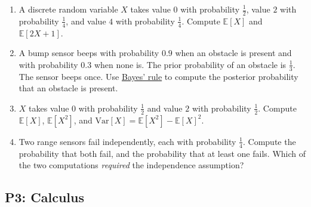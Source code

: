 \documentclass[11pt]{article}
\newcommand{\E}{\mathbb{E}}             %
\newcommand{\Var}{\mathrm{Var}}        %
\newenvironment{studentanswer}[1]
  {\par\noindent\begin{minipage}[t][#1][t]{\linewidth}\ignorespaces}
  {\end{minipage}\par}
\begin{document}
\begin{enumerate}[label=\alph*)]
\item A discrete random variable $X$ takes value $0$ with probability $\tfrac{1}{2}$, value $2$ with probability $\tfrac{1}{4}$, and value $4$ with probability $\tfrac{1}{4}$. Compute $\E[X]$ and $\E[2X + 1]$.

\begin{studentanswer}{3.4cm}
\end{studentanswer}

\item A bump sensor beeps with probability $0.9$ when an obstacle is present and with probability $0.3$ when none is. The prior probability of an obstacle is $\tfrac{1}{3}$. The sensor beeps once. Use \href{https://en.wikipedia.org/wiki/Bayes_theorem}{Bayes' rule} to compute the posterior probability that an obstacle is present.

\begin{studentanswer}{3.4cm}
\end{studentanswer}

\item $X$ takes value $0$ with probability $\tfrac{1}{2}$ and value $2$
      with probability $\tfrac{1}{2}$. Compute $\E[X]$, $\E[X^2]$, and
      $\Var[X] = \E[X^2] - \E[X]^2$.

\begin{studentanswer}{3.2cm}
\end{studentanswer}

\item Two range sensors fail independently, each with probability
      $\tfrac{1}{4}$. Compute the probability that both fail, and the
      probability that at least one fails. Which of the two computations
      \emph{required} the independence assumption?

\begin{studentanswer}{3.4cm}
\end{studentanswer}

\end{enumerate}

\newpage
\subsection*{P3: Calculus}
\end{document}
